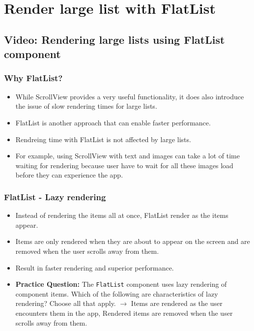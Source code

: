 \chapter{Render large list with FlatList}

\section{Video: Rendering large lists using FlatList component}
\subsection{Why FlatList?}
\begin{itemize}
    \item While ScrollView provides a very useful functionality, it does also introduce the issue of slow rendering times for large lists.
    \item FlatList is another approach that can enable faster performance.
    \item Rendreing time with FlatList is not affected by large lists.
    \item For example, using ScrollView with text and images can take a lot of time waiting for rendering because user have to wait for all these images load before they can experience the app.
\end{itemize}

\subsection{FlatList - Lazy rendering}
\begin{itemize}
    \item Instead of rendering the items all at once, FlatList render as the items appear.
    \item Items are only rendered when they are about to appear on the screen and are removed when the user scrolls away from them.
    \item Result in faster rendering and superior performance.
    \item \textbf{Practice Question:} The \texttt{FlatList} component uses lazy rendering of component items. Which of the following are characteristics of lazy rendering? Choose all that apply.
    $\rightarrow$ Items are rendered as the user encounters them in the app, Rendered items are removed when the user scrolls away from them.
\end{itemize}


